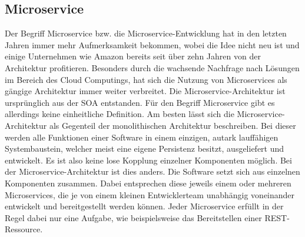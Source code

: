 \subsection{Microservice}

Der Begriff Microservice bzw. die Microservice-Entwicklung hat in den letzten Jahren immer mehr Aufmerksamkeit bekommen,\autocite[Vgl.][Kapitel \enquote{Monolithic architecture overview}]{MS-Sharma.2016} wobei die Idee nicht neu ist und einige Unternehmen wie Amazon bereits seit über zehn Jahren von der Architektur profitieren.\autocite[Vgl.][]{MS-Wolff.02.11.2015} 
Besonders durch die wachsende Nachfrage nach Lösungen im Bereich des Cloud Computings\autocite[Vgl.][]{MS-Herrmann.10.02.2017}, hat sich die Nutzung von Microservices als gängige Architektur immer weiter verbreitet. 
Die Microservice-Architektur ist ursprünglich aus der \acs{SOA} entstanden.\autocite[Vgl.][S. 1]{MS-Bucchiarone.2018} 
Für den Begriff Microservice gibt es allerdings keine einheitliche Definition\autocite[Vgl.][S. 3]{MS-Wolff.2018}. 
Am besten lässt sich die Microservice-Architektur als Gegenteil der monolithischen Architektur beschreiben. 
Bei dieser werden alle Funktionen einer Software in einem einzigen, autark lauffähigen Systembaustein, welcher meist eine eigene Persistenz besitzt, ausgeliefert und entwickelt. 
Es ist also keine lose Kopplung einzelner Komponenten möglich.\autocite[Vgl.][S. 216]{MS-Vogel.2009} 
Bei der Microservice-Architektur ist dies anders. Die Software setzt sich aus einzelnen Komponenten zusammen. 
Dabei entsprechen diese jeweils einem oder mehreren Microservices, die je von einem kleinen Entwicklerteam unabhängig voneinander entwickelt und bereitgestellt werden können.\autocite[Vgl.][]{MS-Fowler.25.03.2014} 
Jeder Microservice erfüllt in der Regel dabei nur eine Aufgabe, wie beispielsweise das Bereitstellen einer \ac{REST}-Ressource.
